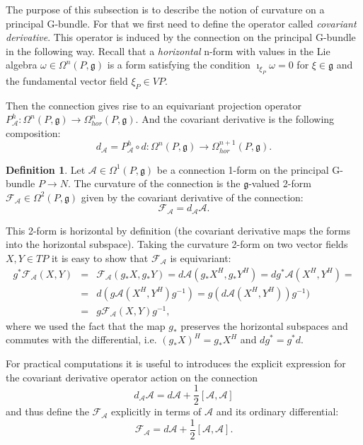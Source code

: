 \documentclass[11pt]{report}
\theoremstyle{plain}
\theoremstyle{definition}
\newtheorem{defn}[thm]{Definition}
\theoremstyle{remark}
\theoremstyle{remark}
\numberwithin{equation}{section}
\begin{document}
The purpose of this subsection is to describe the notion of curvature on a principal G-bundle. For that we first need to define the operator called \textit{covariant derivative}. 
This operator is induced by the connection on the principal G-bundle in the following way. Recall that a \textit{horizontal} n-form with values in the Lie algebra $\omega\in \Omega^n(P,\mathfrak{g})$ is a form satisfying the condition $\imath_{\xi_P} \omega = 0$ for $\xi \in \mathfrak{g}$ and the fundamental vector field $\xi_P \in VP$. 

Then the connection gives rise to an equivariant projection operator $P^h_{\mathcal{A}}: \Omega^n(P,\mathfrak{g}) \to \Omega^n_{hor}(P,\mathfrak{g})$. And the covariant derivative is the following composition:
\begin{equation}
d_{\mathcal{A}} = P^h_{\mathcal{A}}\circ d : \Omega^n(P,\mathfrak{g}) \to \Omega^{n+1}_{hor}(P,\mathfrak{g}).
\end{equation}


\begin{defn}
Let $\mathcal{A} \in \Omega^1(P,\mathfrak{g})$ be a connection 1-form on the principal G-bundle $P\to N$. The curvature of the connection is the $\mathfrak{g}$-valued 2-form $\mathcal{F}_{\mathcal{A}}\in \Omega^2(P,\mathfrak{g})$ given by the covariant derivative of the connection:
$$\mathcal{F}_{\mathcal{A}} = d_{\mathcal{A}} \mathcal{A}.$$
\end{defn}
This 2-form is horizontal by definition (the covariant derivative maps the forms into the horizontal subspace). Taking the curvature 2-form on two vector fields $X, Y \in TP$ it is easy to show that $\mathcal{F}_{\mathcal{A}}$ is equivariant:
%
\begin{equation}
\begin{array}{lcl}
g^*\mathcal{F}_{\mathcal{A}}(X,Y)& = & \mathcal{F}_{\mathcal{A}}(g_*X, g_*Y) = d\mathcal{A} (g_*X^H, g_*Y^H) = d g^*\mathcal{A} (X^H, Y^H) =    \\
&=& d(g\mathcal{A} (X^H, Y^H) g^{-1}) = g(d\mathcal{A} (X^H, Y^H)) g^{-1})\\
&=& g\mathcal{F}_{\mathcal{A}}(X,Y)g^{-1},
\end{array}
\end{equation}
where we used the fact that the map $g_*$ preserves the horizontal subspaces and commutes with the differential, i.e. $(g_*X)^H=g_*X^H$ and $d g^* = g^*d$. 

For practical computations it is useful to introduces the explicit expression for the covariant derivative operator action on the connection
\begin{equation}
d_\mathcal{A} \mathcal{A} = d\mathcal{A} +\frac{1}{2}[\mathcal{A}, \mathcal{A}]
\end{equation}
 and thus define the $\mathcal{F}_{\mathcal{A}}$ explicitly in terms of $\mathcal{A}$ and its ordinary differential:
\begin{equation}
\mathcal{F}_{\mathcal{A}} = d\mathcal{A} +\frac{1}{2}[\mathcal{A}, \mathcal{A}].
\end{equation}
\end{document}
